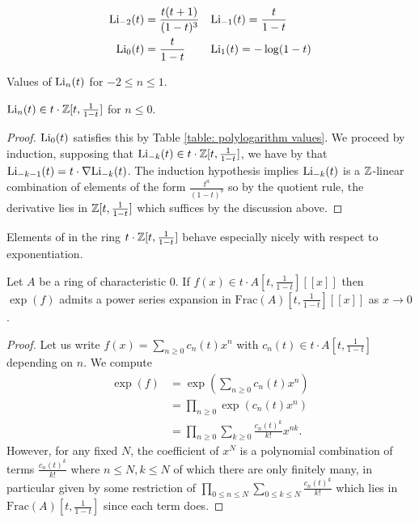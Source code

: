 \begin{table}[h]\label{table: polylogarithm values}
    \begin{align*}
        \mathrm{Li}_{-2}(t)&=\frac{t(t+1)}{(1-t)^{3}} && \mathrm{Li}_{-1}(t)=\frac{t}{1-t} \\
        \mathrm{Li}_{0}(t)&=\frac{t}{1-t} && \mathrm{Li}_{1}(t)=-\log(1-t)
    \end{align*}
    \caption{Values of $\mathrm{Li}_{n}(t)$ for $-2\leq n\leq 1$.}
\end{table}

\begin{lemma}\label{lem: form of negative polylogarithms}
    $\mathrm{Li}_{n}(t)\in t\cdot\mathbb{Z}[t,\frac{1}{1-t}]$ for $n\leq 0$. 
\end{lemma}
\begin{proof}
    $\mathrm{Li}_{0}(t)$ satisfies this by Table \ref{table: polylogarithm values}. We proceed by induction, supposing that $\mathrm{Li}_{-k}(t)\in t\cdot\mathbb{Z}[t,\frac{1}{1-t}]$, we have by  that $\mathrm{Li}_{-k-1}(t)=t\cdot\nabla\mathrm{Li}_{-k}(t)$. The induction hypothesis implies $\mathrm{Li}_{-k}(t)$ is a $\mathbb{Z}$-linear combination of elements of the form $\frac{t^{a}}{(1-t)^{b}}$ so by the quotient rule, the derivative lies in $\mathbb{Z}[t,\frac{1}{1-t}]$ which suffices by the discussion above. 
\end{proof}
Elements of in the ring $t\cdot\mathbb{Z}[t,\frac{1}{1-t}]$ behave especially nicely with respect to exponentiation. 
\begin{lemma}\label{lem: behavior of nonpositive dilogarithms under exponentials}
    Let $A$ be a ring of characteristic 0. If $f(x)\in t\cdot A[t,\frac{1}{1-t}][[x]]$ then $\exp(f)$ admits a power series expansion in $\mathrm{Frac}(A)[t,\frac{1}{1-t}][[x]]$ as $x\to 0$. 
\end{lemma}
\begin{proof}
    Let us write $f(x)=\sum_{n\geq0}c_{n}(t)x^{n}$ with $c_{n}(t)\in t\cdot A[t,\frac{1}{1-t}]$ depending on $n$. We compute
    \begin{align*}
        \exp(f) &= \exp\left(\sum_{n\geq0}c_{n}(t)x^{n}\right) \\
        &= \prod_{n\geq0}\exp(c_{n}(t)x^{n}) \\
        &= \prod_{n\geq0}\sum_{k\geq0}\frac{c_{n}(t)^{k}}{k!}x^{nk}.
    \end{align*}
    However, for any fixed $N$, the coefficient of $x^{N}$ is a polynomial combination of terms $\frac{c_{n}(t)^{k}}{k!}$ where $n\leq N, k\leq N$ of which there are only finitely many, in particular given by some restriction of $\prod_{0\leq n\leq N}\sum_{0\leq k\leq N}\frac{c_{n}(t)^{k}}{k!}$ which lies in $\mathrm{Frac}(A)[t,\frac{1}{1-t}]$ since each term does. 
\end{proof}


